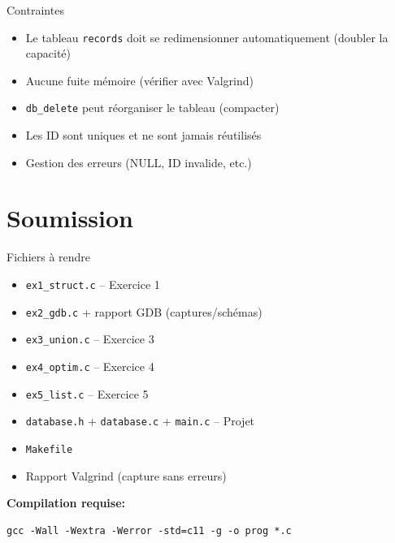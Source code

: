 \documentclass[10pt,a4paper]{article}
\begin{document}
\begin{warningbox}{Contraintes}
\begin{itemize}
\item Le tableau \texttt{records} doit se redimensionner automatiquement (doubler la capacité)
\item Aucune fuite mémoire (vérifier avec Valgrind)
\item \texttt{db\_delete} peut réorganiser le tableau (compacter)
\item Les ID sont uniques et ne sont jamais réutilisés
\item Gestion des erreurs (NULL, ID invalide, etc.)
\end{itemize}
\end{warningbox}

\section*{Soumission}

\begin{infobox}{Fichiers à rendre}
\begin{itemize}
\item \texttt{ex1\_struct.c} -- Exercice 1
\item \texttt{ex2\_gdb.c} + rapport GDB (captures/schémas)
\item \texttt{ex3\_union.c} -- Exercice 3
\item \texttt{ex4\_optim.c} -- Exercice 4
\item \texttt{ex5\_list.c} -- Exercice 5
\item \texttt{database.h} + \texttt{database.c} + \texttt{main.c} -- Projet
\item \texttt{Makefile}
\item Rapport Valgrind (capture sans erreurs)
\end{itemize}

\textbf{Compilation requise:}
\begin{verbatim}
gcc -Wall -Wextra -Werror -std=c11 -g -o prog *.c
\end{verbatim}
\end{infobox}
\end{document}
